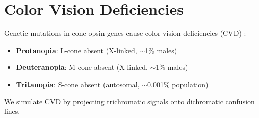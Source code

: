 \documentclass[11pt,a4paper]{article}
\begin{document}
\section{Color Vision Deficiencies}

Genetic mutations in cone opsin genes cause color vision deficiencies (CVD) \cite{sharpe1999opsin, neitz1996number}:

\begin{itemize}
    \item \textbf{Protanopia}: L-cone absent (X-linked, $\sim$1\% males)
    \item \textbf{Deuteranopia}: M-cone absent (X-linked, $\sim$1\% males)
    \item \textbf{Tritanopia}: S-cone absent (autosomal, $\sim$0.001\% population)
\end{itemize}

We simulate CVD by projecting trichromatic signals onto dichromatic confusion lines.
\end{document}
